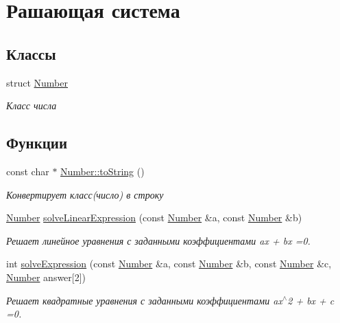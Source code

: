 \hypertarget{group___solution_system}{
\section{Рашающая система}
\label{group___solution_system}
}
\subsection*{Классы}
\begin{DoxyCompactItemize}
\item 
struct \hyperlink{struct_number}{Number}
\begin{DoxyCompactList}\small\item\em Класс числа \item\end{DoxyCompactList}\end{DoxyCompactItemize}
\subsection*{Функции}
\begin{DoxyCompactItemize}
\item 
const char $\ast$ \hyperlink{group___solution_system_ga465cef1eb6dbaa3741d987df52e4df1f}{Number::toString} ()
\begin{DoxyCompactList}\small\item\em Конвертирует класс(число) в строку \item\end{DoxyCompactList}\item 
\hyperlink{struct_number}{Number} \hyperlink{group___solution_system_gab630fcfe8990efe254a8f1a3577c11d5}{solveLinearExpression} (const \hyperlink{struct_number}{Number} \&a, const \hyperlink{struct_number}{Number} \&b)
\begin{DoxyCompactList}\small\item\em Решает линейное уравнения с заданными коэффициентами ax + bx =0. \item\end{DoxyCompactList}\item 
int \hyperlink{group___solution_system_gab791db2a40d6966916e62b86dd46fcb0}{solveExpression} (const \hyperlink{struct_number}{Number} \&a, const \hyperlink{struct_number}{Number} \&b, const \hyperlink{struct_number}{Number} \&c, \hyperlink{struct_number}{Number} answer\mbox{[}2\mbox{]})
\begin{DoxyCompactList}\small\item\em Решает квадратные уравнения с заданными коэффициентами ax$^\wedge$2 + bx + c =0. \item\end{DoxyCompactList}\end{DoxyCompactItemize}
